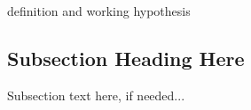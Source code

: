 
  definition and working hypothesis

\subsection{Subsection Heading Here}
Subsection text here, if needed...